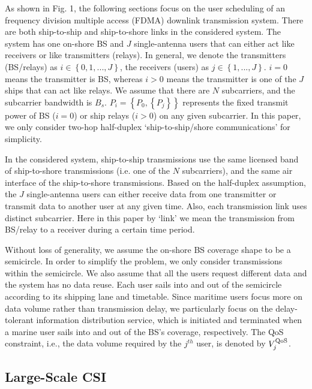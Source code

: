 \documentclass[journal]{IEEEtran}
\begin{document}
 As shown in Fig. 1, the following sections focus on the user scheduling of an frequency division multiple access (FDMA) downlink transmission system. There are both ship-to-ship and ship-to-shore links in the considered system. The system has one on-shore BS and $J$ single-antenna users that can either act like receivers or like transmitters (relays). In general, we denote the transmitters (BS/relays) as $i \in \left\{ {0,1,...,J} \right\}$, the receivers (users) as $j \in \left\{ {1,...,J} \right\}$. $i=0$ means the transmitter is BS, whereas $i>0$ means the transmitter is one of the $J$ ships that can act like relays. We assume that there are $N$ subcarriers, and the subcarrier bandwidth is ${B_s}$. $P_i = \left\{ {P_0,\left\{ {P_j} \right\}} \right\}$ represents the fixed transmit power of BS ($i=0$) or ship relays ($i>0$) on any given subcarrier. In this paper, we only consider two-hop half-duplex `ship-to-ship/shore communications' for simplicity. 
 
 In the considered system, ship-to-ship transmissions use the same licensed band of ship-to-shore transmissions (i.e. one of the $N$ subcarriers), and the same air interface of the ship-to-shore transmissions. 
 Based on the half-duplex assumption, the $J$ single-antenna users can either receive data from one transmitter or transmit data to another user at any given time. 
 Also, each transmission link uses distinct subcarrier. Here in this paper by `link' we mean the transmission from BS/relay to a receiver during a certain time period. 
 
 Without loss of generality, we assume the on-shore BS coverage shape to be a semicircle. 
 In order to simplify the problem, we only consider transmissions within the semicircle. We also assume that all the users request different data and the system has no data reuse. 
 Each user sails into and out of the semicircle according to its shipping lane and timetable. 
 Since maritime users focus more on data volume rather than transmission delay, we particularly focus on the delay-tolerant information distribution service, which is initiated and terminated when a marine user sails into and out of the BS's coverage, respectively. 
 The QoS constraint, i.e., the data volume required by the ${j^{th}}$ user, is denoted by $V_j^{\rm{QoS}}$. 
 
 \subsection{Large-Scale CSI}
 
\end{document}
